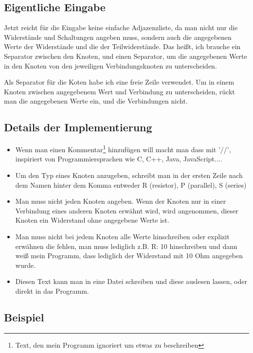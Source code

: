 \documentclass[a4paper,10pt,ngerman]{scrartcl}
\begin{document}
\subsection{Eigentliche Eingabe}

Jetzt reicht für die Eingabe keine einfache Adjazenzliste, da man nicht nur die Widerstände und Schaltungen
angeben muss, sondern auch die angegebenen Werte der Widerstände und die der Teilwiderstände. Das heißt, ich brauche ein Separator zwischen
den Knoten, und einen Separator, um die angegebenen Werte in den Knoten von den jeweiligen Verbindungsknoten zu unterscheiden.

Als Separator für die Koten habe ich eine freie Zeile verwendet. Um in einem Knoten zwischen angegebenem Wert und Verbindung zu unterscheiden, rückt man die angegebenen Werte ein, und die Verbindungen nicht.

\subsection{Details der Implementierung}

\begin{itemize}

\item Wenn man einen Kommentar\footnote{Text, den mein Programm ignoriert um etwas zu beschreiben} hinzufügen will macht man dass mit '//', inspiriert von Programmiersprachen wie C, C++, Java, JavaScript....
\item Um den Typ eines Knoten anzugeben, schreibt man in der ersten Zeile nach dem Namen hinter dem Komma entweder R (resistor), P (parallel), S (series) 
\item Man muss nicht jeden Knoten angeben. Wenn der Knoten nur in einer Verbindung eines anderen Knoten erwähnt wird, wird angenommen, dieser Knoten ein Widerstand ohne angegebene Werte ist.
\item Man muss nicht bei jedem Knoten alle Werte hinschreiben oder explizit erwähnen die fehlen, man muss lediglich z.B. R: 10 hinschreiben und dann weiß mein Programm, dass lediglich der Widerstand mit 10 Ohm angegeben wurde.
\item Diesen Text kann man in eine Datei schreiben und diese auslesen lassen, oder direkt in das Programm.

\end{itemize}

\subsection{Beispiel}
\end{document}
